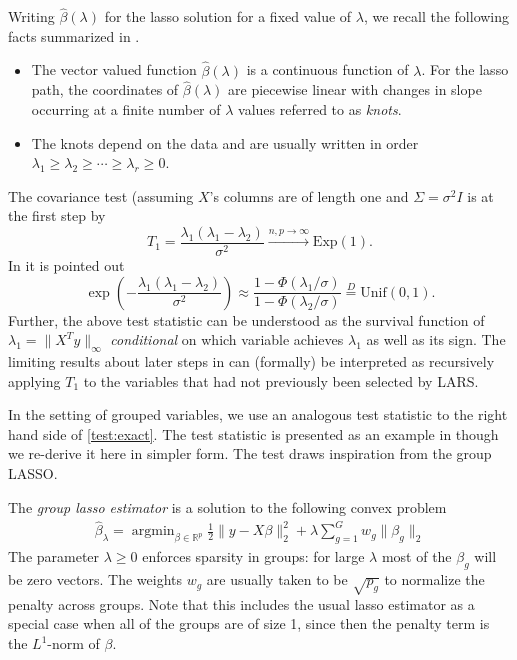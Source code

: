 \documentclass{imsart}
\newcommand{\argmin}{\mathop{\mathrm{argmin}}}
\newcommand{\real}{\mathbb{R}}
\begin{document}
Writing $\hat \beta(\lambda)$ for the lasso solution for a fixed value of $\lambda$, we recall
the following facts summarized in \cite{significance:lasso,tibshirani_lasso_uniqueness}.

\begin{itemize}

  \item The vector valued function $\hat \beta(\lambda)$ is a
    continuous function of $\lambda$. For the lasso path, the
    coordinates of $\hat \beta(\lambda)$ are piecewise linear with
    changes in slope occurring at a finite number of $\lambda$ values
    referred to as \emph{knots}. 
    \item The knots depend on the data and are
    usually written in order $\lambda_1 \geq \lambda_2 \geq \cdots
    \geq \lambda_r \geq 0$. 

\end{itemize}

The covariance test (assuming $X$'s columns are of length one and $\Sigma = \sigma^2 I$ is at the
first step by
\begin{equation}
\label{eq:covtest}
T_1 = \frac{\lambda_1(\lambda_1-\lambda_2)}{\sigma^2} \overset{n,p \to \infty}{\to} \text{Exp}(1).
\end{equation}
In \cite{tests:adaptive} it is pointed out 
\begin{equation}
\label{test:exact}
\exp\left(- \frac{\lambda_1(\lambda_1-\lambda_2)}{\sigma^2} \right) \approx \frac{1 - \Phi(\lambda_1/\sigma)}{1 - \Phi(\lambda_2 / \sigma)} \overset{D}{=} \text{Unif}(0,1).
\end{equation}
Further, the above test statistic can be understood as the survival function of $\lambda_1 = \|X^Ty\|_{\infty}$
{\em conditional} on which variable achieves $\lambda_1$ as well as its sign.
The limiting results about later steps in \cite{significance:lasso} can (formally) be interpreted as
recursively applying $T_1$ to the variables that had not previously been selected by LARS.

In the setting of grouped variables, we use an analogous test statistic to
the right hand side of \eqref{test:exact}. The test statistic is presented as an example
in \cite{tests:adaptive} though we re-derive it here in simpler form. The test draws inspiration
from the group LASSO.

The \emph{group lasso estimator} is a solution to the following convex
problem
\begin{equation}
\begin{aligned}
\label{eq:gsoln}
\displaystyle \hat \beta_\lambda = \argmin_{\beta \in \real^p} \frac{1}{2} \| y - X \beta \|_2^2 +
   \lambda \sum_{g=1}^G w_g \| \beta_g \|_2
\end{aligned}
\end{equation}
The parameter $\lambda \geq 0$ enforces sparsity in groups: for large
$\lambda$ most of the $\beta_g$ will be zero vectors. The weights
$w_g$ are usually taken to be $\sqrt {p_g}$ to normalize the penalty
across groups.  Note that this includes the usual lasso estimator as a
special case when all of the groups are of size 1, since then the
penalty term is the $L^1$-norm of $\beta$. 
\end{document}
